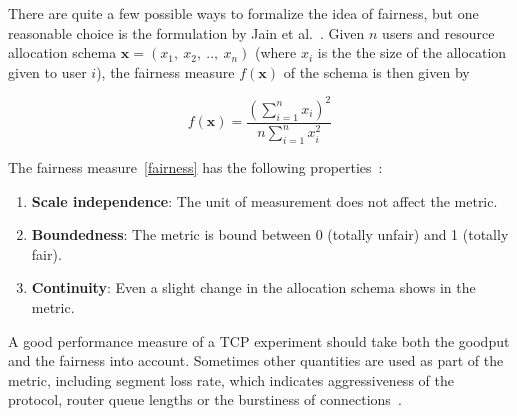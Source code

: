 There are quite a few possible ways to formalize the idea of fairness, but one reasonable choice is the formulation by Jain et al.~\cite{Jain84}. Given $n$ users and resource allocation schema $ \textbf{x} = (x_1,~x_2,~..,~x_n)$ (where $x_i$ is the the size of the allocation given to user $i$), the fairness measure $f(\textbf{x})$ of the schema is then given by

\begin{equation}
f(\textbf{x}) = \frac{ \left(\sum\limits_{i=1}^{n} x_i\right)^2 }{n \sum\limits_{i=1}^{n} x_i^2 } \label{fairness}
\end{equation}

The fairness measure~\eqref{fairness} has the following properties~\cite{Jain84}:
\begin{enumerate}
	\item \textbf{Scale independence}: The unit of measurement does not affect the metric.
	\item \textbf{Boundedness}:  The metric is bound between 0 (totally unfair) and 1 (totally fair).
	\item \textbf{Continuity}: Even a slight change in the allocation schema shows in the metric.  
\end{enumerate}   

A good performance measure of a TCP experiment should take both the goodput and the fairness into account. Sometimes other quantities are used as part of the metric, including segment loss rate, which indicates aggressiveness of the protocol, router queue lengths or the burstiness of connections~\cite{Allman99}. 

 

